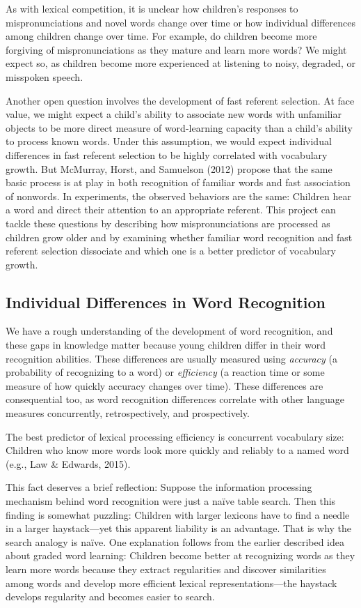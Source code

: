\documentclass[]{book}
\theoremstyle{definition}
\theoremstyle{definition}
\theoremstyle{remark}
\begin{document}
As with lexical competition, it is unclear how children's responses to
mispronunciations and novel words change over time or how individual
differences among children change over time. For example, do children
become more forgiving of mispronunciations as they mature and learn more
words? We might expect so, as children become more experienced at
listening to noisy, degraded, or misspoken speech.

Another open question involves the development of fast referent
selection. At face value, we might expect a child's ability to associate
new words with unfamiliar objects to be more direct measure of
word-learning capacity than a child's ability to process known words.
Under this assumption, we would expect individual differences in fast
referent selection to be highly correlated with vocabulary growth. But
McMurray, Horst, and Samuelson (2012) propose that the same basic
process is at play in both recognition of familiar words and fast
association of nonwords. In experiments, the observed behaviors are the
same: Children hear a word and direct their attention to an appropriate
referent. This project can tackle these questions by describing how
mispronunciations are processed as children grow older and by examining
whether familiar word recognition and fast referent selection dissociate
and which one is a better predictor of vocabulary growth.

\subsection{Individual Differences in Word
Recognition}\label{individual-differences-in-word-recognition}

We have a rough understanding of the development of word recognition,
and these gaps in knowledge matter because young children differ in
their word recognition abilities. These differences are usually measured
using \emph{accuracy} (a probability of recognizing to a word) or
\emph{efficiency} (a reaction time or some measure of how quickly
accuracy changes over time). These differences are consequential too, as
word recognition differences correlate with other language measures
concurrently, retrospectively, and prospectively.

The best predictor of lexical processing efficiency is concurrent
vocabulary size: Children who know more words look more quickly and
reliably to a named word (e.g., Law \& Edwards, 2015).

This fact deserves a brief reflection: Suppose the information
processing mechanism behind word recognition were just a naïve table
search. Then this finding is somewhat puzzling: Children with larger
lexicons have to find a needle in a larger haystack---yet this apparent
liability is an advantage. That is why the search analogy is naïve. One
explanation follows from the earlier described idea about graded word
learning: Children become better at recognizing words as they learn more
words because they extract regularities and discover similarities among
words and develop more efficient lexical representations---the haystack
develops regularity and becomes easier to search.
\end{document}
